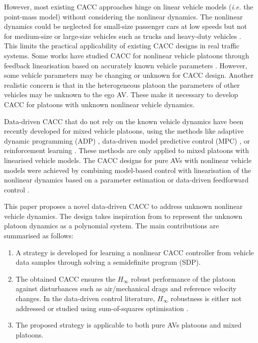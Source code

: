 \documentclass[letterpaper, 10 pt, conference]{ieeeconf}
\begin{document}
	However, most existing CACC approaches hinge on linear vehicle  
	models (\textit{i.e.} the point-mass model) without considering the 
	nonlinear dynamics. 
	The nonlinear dynamics could be neglected for small-size passenger cars at low speeds but not for medium-size or large-size vehicles such as trucks and heavy-duty vehicles \cite{Shen+22}.
	This limits the practical applicability of existing CACC designs in 
	real traffic systems. Some works have studied 
	CACC for nonlinear vehicle platoons through feedback linearisation 
	based on accurately known vehicle parameters 
	\cite{Ghasemi+13,Hu+20,Shen+22}. However, some vehicle parameters may be changing or	unknown for CACC design. Another realistic concern is that in the heterogeneous platoon 
	the parameters of other vehicles may be unknown to the ego AV.
	These make it necessary to develop CACC for platoons with unknown nonlinear 
	vehicle dynamics.
	
	Data-driven CACC that do not rely on the known vehicle dynamics have 
	been recently developed for mixed vehicle platoons, using the methods like adaptive 
	dynamic programming (ADP) \cite{gao2016data,huang2019connected,huang2020learning}, data-driven model predictive control (MPC) \cite{Lan+21d,Wang+22}, or reinforcement learning \cite{chu2019model}. These methods are only applied to mixed platoons with linearised vehicle models.
	The CACC designs for pure AVs with nonlinear vehicle models were achieved by combining model-based control with linearisation of the nonlinear dynamics based on a parameter estimation \cite{Zhu+20} or data-driven feedforward control \cite{Gao+17}. 
	
	
	This paper proposes a novel data-driven CACC to address unknown nonlinear vehicle dynamics. The design takes inspiration from \cite{Strasser+21,Persis+23} to represent the unknown platoon dynamics as a polynomial system. The main contributions are summarised as follows: 
	\begin{enumerate}
		\item A strategy is developed for learning a nonlinear CACC controller from vehicle data samples through solving a semidefinite program (SDP).
		\item The obtained CACC ensures the $H_\infty$ robust performance of the platoon against disturbances such as air/mechanical drags and reference velocity changes. In the data-driven control literature, $H_\infty$ robustness is either not addressed \cite{Persis+23} or studied using sum-of-squares optimisation \cite{Strasser+21}.
		\item The proposed strategy is applicable to both pure AVs platoons and mixed platoons.
	\end{enumerate} 
	
\end{document}
